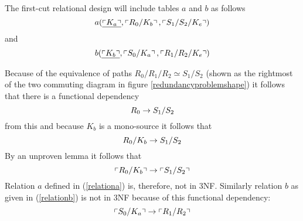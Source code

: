 The first-cut relational design will include tables $a$ and $b$ as follows
\begin{equation}
\label{relationa}
a(\underline{\left\ulcorner K_a\right\urcorner},\left\ulcorner R_0/K_b\right\urcorner,\left\ulcorner S_1/S_2/K_e\right\urcorner)
\end{equation}
and
\begin{equation}
\label{relationb}
b(\underline{\left\ulcorner K_b\right\urcorner},\left\ulcorner S_0/K_a\right\urcorner,\left\ulcorner R_1/R_2/K_e\right\urcorner)
\end{equation}

Because of the equivalence of paths $R_0/R_1/R_2 \simeq S_1/S_2$ (shown as the rightmost of the two
commuting diagram in figure \ref{redundancyproblemshape}) it follows that 
there is a functional dependency
\begin{equation}
R_0 \rightarrow S_1/S_2
\end{equation}
from this and because $K_b$ is a mono-source it follows that
\begin{equation}
R_0/K_b \rightarrow S_1/S_2
\end{equation}
By an unproven lemma it follows that 
\begin{equation}
\left\ulcorner R_0/K_b\right\urcorner \rightarrow \left\ulcorner S_1/S_2\right\urcorner
\end{equation}
Relation $a$ defined in (\ref{relationa}) is, therefore, not in 3NF. Similarly relation $b$ as given in
(\ref{relationb}) is not in 3NF because of this functional dependency:
\begin{equation}
\left\ulcorner S_0/K_a\right\urcorner \rightarrow \left\ulcorner R_1/R_2\right\urcorner
\end{equation}

